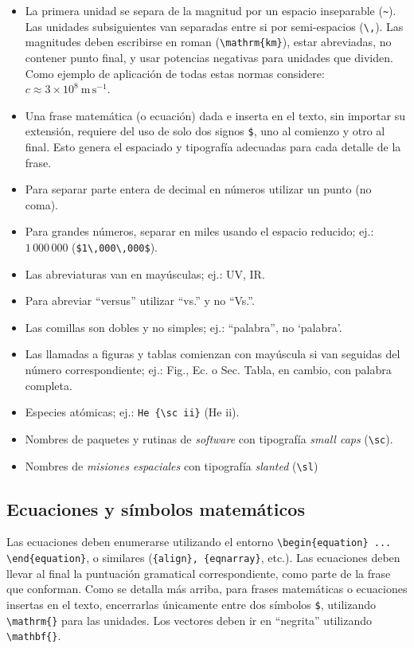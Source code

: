 \documentclass[baaa]{baaa}
\begin{document}
\begin{itemize}
 \item La primera unidad se separa de la magnitud por un espacio inseparable (\verb|~|). Las unidades subsiguientes van separadas entre si por semi-espacios (\verb|\,|). Las magnitudes deben escribirse en roman (\verb|\mathrm{km}|), estar abreviadas, no contener punto final, y usar potencias negativas para unidades que dividen. Como ejemplo de aplicación de todas estas normas considere: $c \approx 3 \times 10^8~\mathrm{m\,s}^{-1}$.
 \item Una frase matemática (o ecuación) dada e inserta en el texto, sin importar su extensión, requiere del uso de solo dos signos \verb|$|, uno al comienzo y otro al final. Esto genera el espaciado y tipografía adecuadas para cada detalle de la frase.
  \item Para separar parte entera de decimal en números utilizar un punto (no coma).
  \item Para grandes números, separar en miles usando el espacio reducido; ej.: $1\,000\,000$ (\verb+$1\,000\,000$+).
  \item Las abreviaturas van en mayúsculas; ej.: UV, IR.
  \item Para abreviar ``versus'' utilizar ``vs.'' y no ``Vs.''.
  \item Las comillas son dobles y no simples; ej.: ``palabra'', no `palabra'.
  \item Las llamadas a figuras y tablas comienzan con mayúscula si van seguidas del número correspon\-dien\-te; ej.: Fig., Ec. o Sec. Tabla, en cambio, con pa\-la\-bra completa.
  \item Especies atómicas; ej.: \verb|He {\sc ii}| (He {\sc ii}).
  \item Nombres de {\sc paquetes} y {\sc rutinas} de {\em software} con tipografía {\em small caps} (\verb|\sc|).
  \item Nombres de {\sl misiones espaciales} con tipografía {\em slanted} (\verb|\sl|)
\end{itemize}

\subsection{Ecuaciones y símbolos matemáticos}

Las ecuaciones deben enumerarse utilizando el entorno \verb|\begin{equation} ... \end{equation}|, o similares (\verb|{align}, {eqnarray}|, etc.). Las ecuaciones deben llevar al final la puntuación gramatical correspondiente, como parte de la frase que conforman. Como se detalla más arriba, para frases matemáticas o ecuaciones insertas en el texto, encerrarlas únicamente entre dos símbolos \verb|$|, utilizando \verb|\mathrm{}| para las unidades. Los vectores deben ir en ``negrita'' utilizando \verb|\mathbf{}|.
\end{document}
